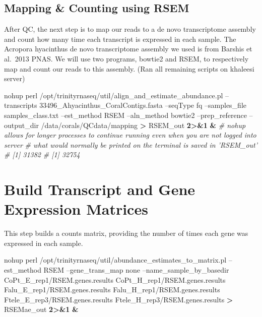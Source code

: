 \documentclass[]{article}
\newenvironment{Shaded}{\begin{snugshade}}{\end{snugshade}}
\newcommand{\CommentTok}[1]{\textcolor[rgb]{0.56,0.35,0.01}{\textit{#1}}}
\newcommand{\FunctionTok}[1]{\textcolor[rgb]{0.00,0.00,0.00}{#1}}
\newcommand{\KeywordTok}[1]{\textcolor[rgb]{0.13,0.29,0.53}{\textbf{#1}}}
\newcommand{\NormalTok}[1]{#1}
\newcommand{\OperatorTok}[1]{\textcolor[rgb]{0.81,0.36,0.00}{\textbf{#1}}}
\begin{document}
\hypertarget{mapping-counting-using-rsem}{%
\subsection{Mapping \& Counting using
RSEM}\label{mapping-counting-using-rsem}}

After QC, the next step is to map our reads to a de novo transcriptome
assembly and count how many time each transcript is expressed in each
sample. The Acropora hyacinthus de novo transcriptome assembly we used
is from Barshis et al.~2013 PNAS. We will use two programs, bowtie2 and
RSEM, to respectively map and count our reads to this assembly. (Ran all
remaining scripts on khaleesi server)

\begin{Shaded}
\begin{Highlighting}[]
\FunctionTok{nohup}\NormalTok{ perl /opt/trinityrnaseq/util/align_and_estimate_abundance.pl --transcripts 33496_Ahyacinthus_CoralContigs.fasta --seqType fq --samples_file samples_class.txt --est_method RSEM --aln_method bowtie2 --prep_reference --output_dir /data/corals/QCdata/mapping }\OperatorTok{>}\NormalTok{ RSEM_out }\OperatorTok{2>&1} \KeywordTok{&}
\CommentTok{# nohup allows for longer processes to continue running even when you are not logged into server}
\CommentTok{# what would normally be printed on the terminal is saved in 'RSEM_out'}
\CommentTok{# [1] 31382}
\CommentTok{# [1] 32754}
\end{Highlighting}
\end{Shaded}

\hypertarget{build-transcript-and-gene-expression-matrices}{%
\section{Build Transcript and Gene Expression
Matrices}\label{build-transcript-and-gene-expression-matrices}}

This step builds a counts matrix, providing the number of times each
gene was expressed in each sample.

\begin{Shaded}
\begin{Highlighting}[]
\FunctionTok{nohup}\NormalTok{ perl /opt/trinityrnaseq/util/abundance_estimates_to_matrix.pl --est_method RSEM  --gene_trans_map none --name_sample_by_basedir CoPt_E_rep1/RSEM.genes.results CoPt_H_rep1/RSEM.genes.results Falu_E_rep1/RSEM.genes.results Falu_H_rep1/RSEM.genes.results Ftele_E_rep3/RSEM.genes.results Ftele_H_rep3/RSEM.genes.results }\OperatorTok{>}\NormalTok{ RSEMae_out }\OperatorTok{2>&1} \KeywordTok{&}
\end{Highlighting}
\end{Shaded}
\end{document}
